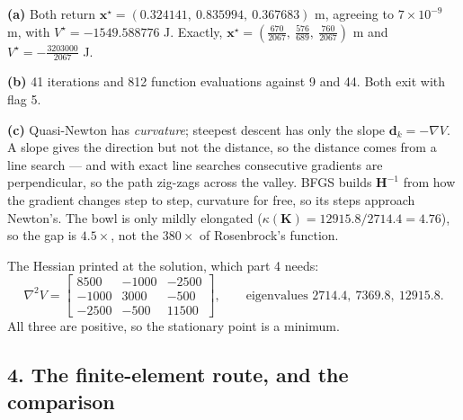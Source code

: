 \documentclass[11pt,a4paper]{article}
\begin{document}
\textbf{(a)} Both return
$\bm{x}^\star = (0.324141,\ 0.835994,\ 0.367683)$ m, agreeing to
$7 \times 10^{-9}$ m, with $V^\star = -1549.588776$ J. Exactly,
$\bm{x}^\star = \left(\tfrac{670}{2067},\ \tfrac{576}{689},\ \tfrac{760}{2067}\right)$ m
and $V^\star = -\tfrac{3203000}{2067}$ J.

\textbf{(b)} 41 iterations and 812 function evaluations against 9 and 44. Both
exit with flag 5.

\textbf{(c)} Quasi-Newton has \emph{curvature}; steepest descent has only the
slope $\bm{d}_k = -\nabla V$. A slope gives the direction but not the distance,
so the distance comes from a line search --- and with exact line searches
consecutive gradients are perpendicular, so the path zig-zags across the valley.
BFGS builds $\bm{H}^{-1}$ from how the gradient changes step to step, curvature
for free, so its steps approach Newton's. The bowl is only mildly elongated
($\kappa(\bm{K}) = 12915.8/2714.4 = 4.76$), so the gap is $4.5\times$, not the
$380\times$ of Rosenbrock's function.

The Hessian printed at the solution, which part 4 needs:
\[
  \nabla^2 V = \begin{bmatrix} 8500 & -1000 & -2500 \\ -1000 & 3000 & -500 \\
                               -2500 & -500 & 11500 \end{bmatrix},
  \qquad \text{eigenvalues } 2714.4,\ 7369.8,\ 12915.8 .
\]
All three are positive, so the stationary point is a minimum.

\subsection*{4. The finite-element route, and the comparison}
\end{document}
